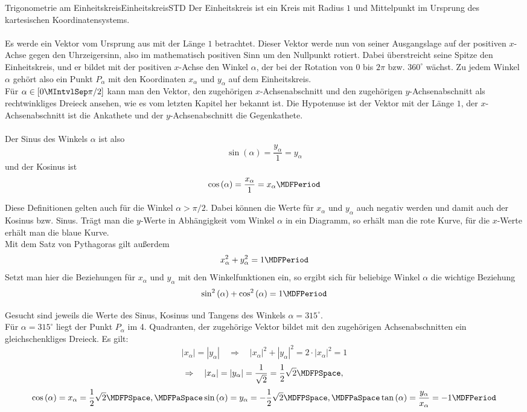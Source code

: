 \begin{MXContent}{Trigonometrie am Einheitskreis}{Einheitskreis}{STD}
Der Einheitskreis ist ein Kreis mit Radius $1$ und Mittelpunkt im Ursprung des kartesischen Koordinatensystems.\\
\ \\
 Es werde ein Vektor vom Ursprung aus mit der L\"ange $1$ betrachtet. Dieser Vektor werde nun von seiner Ausgangslage auf der positiven $x$-Achse gegen den Uhrzeigersinn, also im mathematisch positiven Sinn um den Nullpunkt rotiert. Dabei \"uberstreicht seine Spitze den Einheitskreis, und er bildet mit der positiven $x$-Achse den Winkel $\alpha$, der bei der Rotation von $0$ bis $2\pi$ bzw. $360^\circ$ w\"achst. Zu jedem Winkel $\alpha$ geh\"ort also ein Punkt $P_\alpha$ mit den Koordinaten $x_\alpha$ und $y_\alpha$ auf dem Einheitskreis.
\ \\
F\"ur $\alpha\in\left[0\MIntvlSep \pi/2\right]$ kann man den Vektor, den zugeh\"origen $x$-Achsenabschnitt und den zugeh\"origen $y$-Achsenabschnitt als rechtwinkliges Dreieck ansehen, wie es vom letzten Kapitel her bekannt ist. Die Hypotenuse ist der Vektor mit der L\"ange $1$, der $x$-Achsenabschnitt ist die Ankathete und der $y$-Achsenabschnitt die Gegenkathete.\\
\ \\
Der Sinus des Winkels $\alpha$ ist also
\[\sin\left(\alpha\right)=\frac{y_\alpha}{1}=y_\alpha\]
und der Kosinus ist
\[\cos\left(\alpha\right)=\frac{x_\alpha}{1}=x_\alpha \MDFPeriod\]

Diese Definitionen gelten auch f\"ur die Winkel $\alpha>\pi/2$. Dabei k\"onnen die Werte f\"ur $x_\alpha$ und $y_\alpha$ auch negativ werden und damit auch der Kosinus bzw. Sinus. Tr\"agt man die $y$-Werte in Abh\"angigkeit vom Winkel $\alpha$ in ein Diagramm, so erh\"alt man die rote Kurve, f\"ur die $x$-Werte erh\"alt man die blaue Kurve.
\ \\
Mit dem Satz von Pythagoras gilt au\ss erdem
\[x_{\alpha}^{2}+y_{\alpha}^{2}=1 \MDFPeriod\]
Setzt man hier die Beziehungen f\"ur $x_{\alpha}$ und $y_{\alpha}$ mit den Winkelfunktionen ein, so ergibt sich f\"ur beliebige Winkel $\alpha$ die wichtige Beziehung
\[\sin^2\left(\alpha\right)+\cos^2\left(\alpha\right)=1 \MDFPeriod\]


\begin{MExample}
Gesucht sind jeweils die Werte des Sinus, Kosinus und Tangens des Winkels $\alpha=315^\circ$.\\

F\"ur $\alpha=315^\circ$ liegt der Punkt $P_\alpha$ im 4. Quadranten, der zugeh\"orige Vektor bildet mit den zugeh\"origen Achsenabschnitten ein gleichschenkliges Dreieck. Es gilt: \[\left|x_\alpha\right|=\left|y_\alpha\right|\quad\Rightarrow\quad \left|x_\alpha\right|^2+\left|y_\alpha\right|^2=2\cdot\left|x_\alpha\right|^2=1\]
\[\Rightarrow\quad \left|x_\alpha\right|=\left|y_\alpha\right|=\frac{1}{\sqrt 2}=\frac{1}{2}\sqrt 2 \MDFPSpace,\]
\[\cos\left(\alpha\right)=x_\alpha=\frac{1}{2}\sqrt 2 \MDFPSpace,	\MDFPaSpace	\sin\left(\alpha\right)=y_\alpha=-\frac{1}{2}\sqrt 2 \MDFPSpace,	\MDFPaSpace	\tan\left(\alpha\right)=\frac{y_\alpha}{x_\alpha}=-1 \MDFPeriod\]
\end{MExample}

\end{MXContent}


